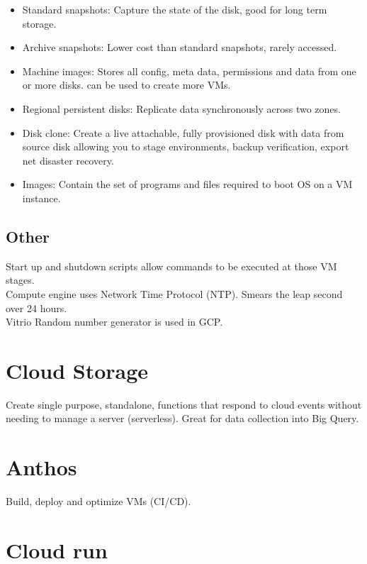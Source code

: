 \documentclass[11pt]{scrartcl} %
\begin{document}
\begin{itemize}
	\item Standard snapshots: Capture the state of the disk, good for long term storage.
	\item Archive snapshots: Lower cost than standard snapshots, rarely accessed.
	\item Machine images: Stores all config, meta data, permissions and data from one or more disks.
	can be used to create more VMs.
	\item Regional persistent disks: Replicate data synchronously across two zones.
	\item Disk clone: Create a live attachable, fully provisioned disk with data from source disk
	allowing you to stage environments, backup verification, export net disaster recovery.
	\item Images: Contain the set of programs and files required to boot OS on a VM instance.
\end{itemize}

\subsection{Other}

Start up and shutdown scripts allow commands to be executed at those VM stages.\\

Compute engine uses Network Time Protocol (NTP). Smears the leap second over 24 hours.\\

Vitrio Random number generator is used in GCP.

\section{Cloud Storage}

Create single purpose, standalone, functions that respond to cloud events without needing to manage
a server (serverless). Great for data collection into Big Query.

\section{Anthos}

Build, deploy and optimize VMs (CI/CD).

\section{Cloud run}
\end{document}
